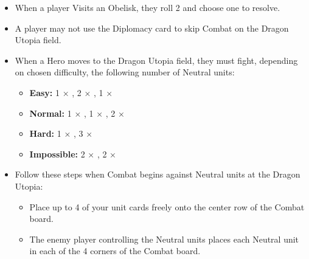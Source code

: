 \begin{multicols*}{2}
\begin{itemize}
  \item When a player Visits an Obelisk, they roll 2  and choose one to resolve.
  \item A player may not use the Diplomacy card to skip Combat on the Dragon Utopia field.
  \item When a Hero moves to the Dragon Utopia field, they must fight, depending on chosen difficulty, the following number of Neutral units:
  \begin{itemize}[leftmargin=15pt]
    \item \textbf{Easy:} 1 × , 2 × , 1 × 
    \item \textbf{Normal:} 1 × , 1 × , 2 × 
    \item \textbf{Hard:} 1 × , 3 × 
    \item \textbf{Impossible:}  2 × , 2 × 
  \end{itemize}
  \item Follow these steps when Combat begins against Neutral units at the Dragon Utopia:
  \begin{itemize}[leftmargin=15pt]
    \item Place up to 4 of your unit cards freely onto the center row of the Combat board.
    \item The enemy player controlling the Neutral units places each Neutral unit in each of the 4 corners of the Combat board.
  \end{itemize}
\end{itemize}


\end{multicols*}
